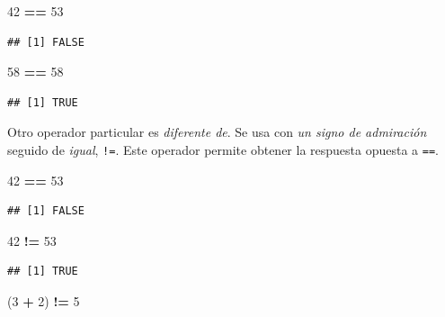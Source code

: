 \documentclass[]{book}
\newenvironment{Shaded}{\begin{snugshade}}{\end{snugshade}}
\newcommand{\DecValTok}[1]{\textcolor[rgb]{0.00,0.00,0.81}{#1}}
\newcommand{\StringTok}[1]{\textcolor[rgb]{0.31,0.60,0.02}{#1}}
\newcommand{\OperatorTok}[1]{\textcolor[rgb]{0.81,0.36,0.00}{\textbf{#1}}}
\newcommand{\NormalTok}[1]{#1}
\begin{document}
\begin{Shaded}
\begin{Highlighting}[]
\DecValTok{42} \OperatorTok{==}\StringTok{ }\DecValTok{53}
\end{Highlighting}
\end{Shaded}

\begin{verbatim}
## [1] FALSE
\end{verbatim}

\begin{Shaded}
\begin{Highlighting}[]
\DecValTok{58} \OperatorTok{==}\StringTok{ }\DecValTok{58}
\end{Highlighting}
\end{Shaded}

\begin{verbatim}
## [1] TRUE
\end{verbatim}

Otro operador particular es \emph{diferente de}. Se usa con \emph{un
signo de admiración} seguido de \emph{igual}, \texttt{!=}. Este operador
permite obtener la respuesta opuesta a \texttt{==}.

\begin{Shaded}
\begin{Highlighting}[]
\DecValTok{42} \OperatorTok{==}\StringTok{ }\DecValTok{53}
\end{Highlighting}
\end{Shaded}

\begin{verbatim}
## [1] FALSE
\end{verbatim}

\begin{Shaded}
\begin{Highlighting}[]
\DecValTok{42} \OperatorTok{!=}\StringTok{ }\DecValTok{53}
\end{Highlighting}
\end{Shaded}

\begin{verbatim}
## [1] TRUE
\end{verbatim}

\begin{Shaded}
\begin{Highlighting}[]
\NormalTok{(}\DecValTok{3} \OperatorTok{+}\StringTok{ }\DecValTok{2}\NormalTok{) }\OperatorTok{!=}\StringTok{ }\DecValTok{5}
\end{Highlighting}
\end{Shaded}
\end{document}

